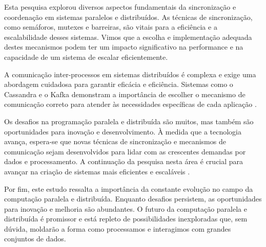\documentclass[conference]{IEEEtran}
\begin{document}
Esta pesquisa explorou diversos aspectos fundamentais da sincronização e coordenação em sistemas paralelos e distribuídos. As técnicas de sincronização, como semáforos, mutexes e barreiras, são vitais para a eficiência e a escalabilidade desses sistemas. Vimos que a escolha e implementação adequada destes mecanismos podem ter um impacto significativo na performance e na capacidade de um sistema de escalar eficientemente.

A comunicação inter-processos em sistemas distribuídos é complexa e exige uma abordagem cuidadosa para garantir eficácia e eficiência. Sistemas como o Cassandra e o Kafka demonstram a importância de escolher o mecanismo de comunicação correto para atender às necessidades específicas de cada aplicação \cite{lakshman2010cassandra, kreps2011kafka}.

Os desafios na programação paralela e distribuída são muitos, mas também são oportunidades para inovação e desenvolvimento. À medida que a tecnologia avança, espera-se que novas técnicas de sincronização e mecanismos de comunicação sejam desenvolvidos para lidar com as crescentes demandas por dados e processamento. A continuação da pesquisa nesta área é crucial para avançar na criação de sistemas mais eficientes e escaláveis \cite{hennessy2011computer}.

Por fim, este estudo ressalta a importância da constante evolução no campo da computação paralela e distribuída. Enquanto desafios persistem, as oportunidades para inovação e melhoria são abundantes. O futuro da computação paralela e distribuída é promissor e está repleto de possibilidades inexploradas que, sem dúvida, moldarão a forma como processamos e interagimos com grandes conjuntos de dados.


\end{document}
